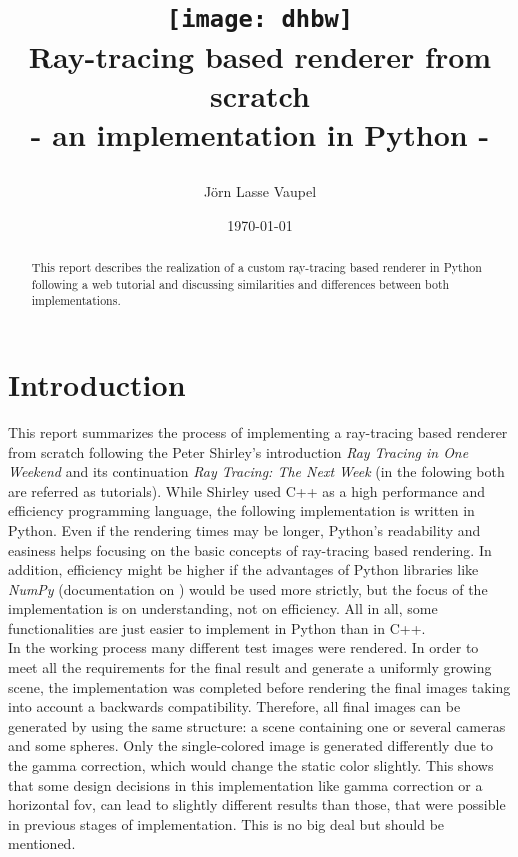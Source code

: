 \documentclass[]{article}
\title{\raggedright\texttt{[image: dhbw]}\\[2cm]
		\centering Ray-tracing based renderer from scratch\\- an implementation in Python -}
\author{Jörn Lasse Vaupel}
\date{\today}
\begin{document}
	
	\maketitle
	\vfill
	\begin{abstract}
		\noindent
		This report describes the realization of a custom ray-tracing based renderer in Python following a web tutorial and discussing similarities and differences between both implementations.
	\end{abstract}

	\newpage
	\tableofcontents
	\newpage
	
	\section{Introduction}
	\label{sec:intro}
	This report summarizes the process of implementing a ray-tracing based renderer from scratch following the Peter Shirley’s introduction \emph{Ray Tracing in One Weekend}  \cite{Shirley2020RTW1} and its continuation \emph{Ray Tracing: The Next Week} \cite{Shirley2020RTW2} (in the folowing both are referred as tutorials). While Shirley used C++ as a high performance and efficiency programming language, the following implementation is written in Python.  Even if the rendering times may be longer, Python’s readability and easiness helps focusing on the basic concepts of ray-tracing based rendering. In addition, efficiency might be higher if the advantages of Python libraries like \emph{NumPy} (documentation on \cite{NP}) would be used more strictly, but the focus of the implementation is on understanding, not on efficiency. All in all, some functionalities are just easier to implement in Python than in C++.
	\\
	In the working process many different test images were rendered. In order to meet all the requirements for the final result and generate a uniformly growing scene, the implementation was completed before rendering the final images taking into account a backwards compatibility. Therefore, all final images can be generated by using the same structure: a scene containing one or several cameras and some spheres. Only the single-colored image is generated differently due to the gamma correction, which would change the static color slightly. This shows that some design decisions in this implementation like gamma correction or a horizontal \ac{fov}, can lead to slightly different results than those, that were possible in previous stages of implementation. This is no big deal but should be mentioned.
	
\end{document}
